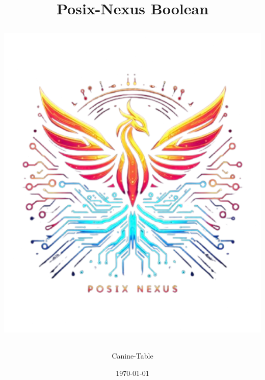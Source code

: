 \documentclass[a4paper,12pt]{article}
\begin{document}
	\label{top}
	\title{
		\textbf{Posix-Nexus Boolean}\\[5mm]
		\begin{NexMainBox}[dark, shpA,fit, width=\linewidth/2]
			\includegraphics[width=\textwidth]{img/posix-nexus.png}
		\end{NexMainBox}
	}
	\author{Canine-Table}
	\date{\today}
	\maketitle
	\newpage
	\begin{NexMainBox}[light, title=Contents, hdrB, breakable]
		\thispagestyle{plain}
		\tableofcontents
	\end{NexMainBox}
	\newpage
\end{document}
